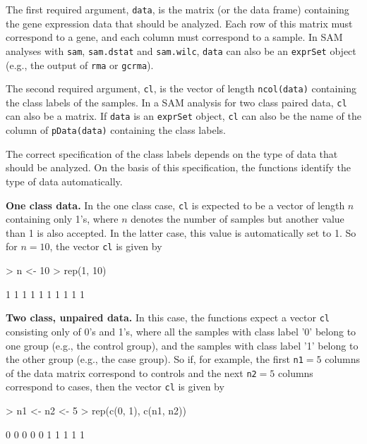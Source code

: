 \documentclass[a4paper]{article}
\begin{document}
The first required argument, \texttt{data}, is the matrix (or the
data frame) containing the gene expression data that should be
analyzed. Each row of this matrix must correspond to a gene, and
each column must correspond to a sample. In SAM analyses with \texttt{sam},
\texttt{sam.dstat} and \texttt{sam.wilc}, \texttt{data}
can also be an \texttt{exprSet} object (e.g., the output of \texttt{rma} or
\texttt{gcrma}).

The second required argument, \texttt{cl}, is the vector of length \texttt{ncol(data)}
containing the class labels of the samples. In a SAM analysis for two
class paired data, \texttt{cl} can also be a matrix. If \texttt{data}
is an \texttt{exprSet} object, \texttt{cl} can also be the name of the column
of \texttt{pData(data)} containing the class labels.

The correct specification of the class labels depends on the type of data that
should be analyzed. On the basis of this specification, the
functions identify the type of data automatically.

\vspace*{18pt}
\noindent \textbf{One class data.} In the one class case, \texttt{cl} is expected to
be a vector of length $n$ containing only 1's, where $n$ denotes the number of
samples but another value than 1 is also accepted. In the latter case,
this value is automatically set to 1. So for $n=10$, the vector \texttt{cl} is given by

\begin{Schunk}
\begin{Sinput}
> n <- 10
> rep(1, 10)
\end{Sinput}
\begin{Soutput}
 [1] 1 1 1 1 1 1 1 1 1 1
\end{Soutput}
\end{Schunk}


\vspace*{18pt} \noindent \textbf{Two class, unpaired data.} In
this case, the functions expect a vector \texttt{cl} consisting
only of 0's and 1's, where all the samples with class label '0'
belong to one group (e.g., the control group), and the samples
with class label '1' belong to the other group (e.g., the
case group). So if, for example, the first \texttt{n1}$=5$ columns of the
data matrix correspond to controls and the next \texttt{n2}$=5$
columns correspond to cases, then the vector \texttt{cl} is given
by

\begin{Schunk}
\begin{Sinput}
> n1 <- n2 <- 5
> rep(c(0, 1), c(n1, n2))
\end{Sinput}
\begin{Soutput}
 [1] 0 0 0 0 0 1 1 1 1 1
\end{Soutput}
\end{Schunk}
\end{document}
